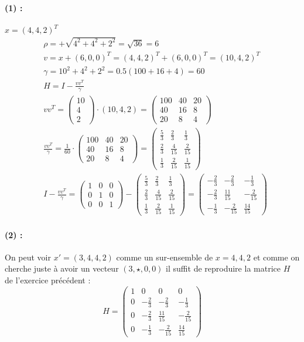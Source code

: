 \documentclass[a4paper,9pt]{extarticle}
\newcommand{\matddd}[3]{\begin{pmatrix}#1\\#2\\#3\end{pmatrix}}
\begin{document}
\paragraph*{(1) : } $x=(4,4,2)^T$
\begin{align*}
& \rho = + \sqrt{4^2+4^2+2^2} = \sqrt{36} = 6 \\
& v = x + (6,0,0)^T = (4,4,2)^T+(6,0,0)^T = (10,4,2)^T \\
& \gamma = 10^2+4^2+2^2 = 0.5(100 + 16 + 4) = 60 \\
& H = I - \frac{vv^T}{\gamma} \\
& vv^T = \matddd{10}{4}{2} \cdot (10,4,2) = \begin{pmatrix}
100 & 40 & 20 \\
40  & 16 & 8  \\
20  & 8  & 4
\end{pmatrix}\\
&\frac{vv^T}{\gamma} = \frac{1}{60} \cdot \begin{pmatrix}
100 & 40 & 20 \\
40  & 16 & 8  \\
20  & 8  & 4
\end{pmatrix} = \begin{pmatrix}
\frac{5}{3} & \frac{2}{3} & \frac{1}{3} \\
\frac{2}{3} & \frac{4}{15} & \frac{2}{15}  \\
\frac{1}{3} & \frac{2}{15}  & \frac{1}{15}
\end{pmatrix}\\
& I - \frac{vv^T}{\gamma} = \begin{pmatrix}
1 & 0 & 0 \\
0 & 1 & 0 \\
0 & 0 & 1
\end{pmatrix} - \begin{pmatrix}
\frac{5}{3} & \frac{2}{3} & \frac{1}{3} \\
\frac{2}{3} & \frac{4}{15} & \frac{2}{15}  \\
\frac{1}{3} & \frac{2}{15}  & \frac{1}{15}
\end{pmatrix} =
\begin{pmatrix}
-\frac{2}{3} & -\frac{2}{3} & -\frac{1}{3} \\
-\frac{2}{3} & \frac{11}{15} & -\frac{2}{15} \\
-\frac{1}{3} & -\frac{2}{15} & \frac{14}{15} 
\end{pmatrix}
\end{align*}

\paragraph*{(2) : } On peut voir $x'=(3,4,4,2)$ comme un sur-ensemble de $x=4,4,2$ et comme on cherche juste à avoir un vecteur $(3,\star,0,0)$ il suffit de reproduire la matrice $H$ de l'exercice précédent :
$$
H = \begin{pmatrix}
1 & 0 & 0 & 0 \\
0 &-\frac{2}{3} & -\frac{2}{3} & -\frac{1}{3} \\
0 &-\frac{2}{3} & \frac{11}{15} & -\frac{2}{15} \\
0 &-\frac{1}{3} & -\frac{2}{15} & \frac{14}{15}
\end{pmatrix}
$$
\end{document}
